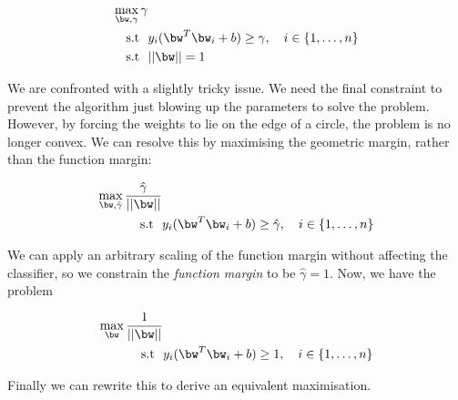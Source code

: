 \begin{align}
\max_{\bw, \gamma} \gamma & \\
\mbox{\text{s.t }  } &  y_i (\bw^T \bw_i + b) \geq \gamma, \quad i \in \{1, \dots, n\} \\
\mbox{\text{s.t }  } & ||\bw|| = 1
\end{align}

We are confronted with a slightly tricky issue.  We need the final constraint to prevent the algorithm just blowing up the parameters to solve the problem.  However, by forcing the weights to lie on the edge of a circle, the problem is no longer convex. We can resolve this by maximising the geometric margin, rather than the function margin:

\begin{align}
\max_{\bw, \hat{\gamma}} \frac{\hat{\gamma}}{||\bw||} & \\
\mbox{\text{s.t }  } &  y_i (\bw^T \bw_i + b) \geq \hat{\gamma}, \quad i \in \{1, \dots, n\}
\end{align}

We can apply an arbitrary scaling of the function margin without affecting the classifier, so we constrain the  \textit{function margin} to be $\hat{\gamma} = 1$.  Now, we have the problem

\begin{align}
\max_{\bw} \frac{1}{||\bw||} & \\
\mbox{\text{s.t }  } &  y_i (\bw^T \bw_i + b) \geq 1, \quad i \in \{1, \dots, n\}
\end{align}

Finally we can rewrite this to derive an equivalent maximisation.